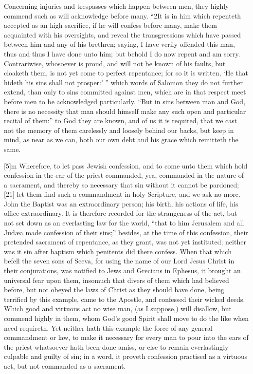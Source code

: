 Concerning injuries and trespasses which happen between men, they highly commend such as will acknowledge before many. “2It is in him which repenteth accepted as an high sacrifice, if he will confess before many, make them acquainted with his oversights, and reveal the transgressions which have passed between him and any of his brethren; saying, I have verily offended this man, thus and thus I have done unto him; but behold I do now repent and am sorry. Contrariwise, whosoever is proud, and will not be known of his faults, but cloaketh them, is not yet come to perfect repentance; for so it is written, ‘He that hideth his sins shall not prosper:’ ” which words of Salomon they do not further extend, than only to sins committed against men, which are in that respect meet before men to be acknowledged particularly. “But in sins between man and God, there is no necessity that man should himself make any such open and particular recital of them:” to God they are known, and of us it is required, that we cast not the memory of them carelessly and loosely behind our backs, but keep in mind, as near as we can, both our own debt and his grace which remitteth the same.

[5]m Wherefore, to let pass Jewish confession, and to come unto them which hold confession in the ear of the priest commanded, yea, commanded in the nature of a sacrament, and thereby so necessary that sin without it cannot be pardoned; [21] let them find such a commandment in holy Scripture, and we ask no more. John the Baptist was an extraordinary person; his birth, his actions of life, his office extraordinary. It is therefore recorded for the strangeness of the act, but not set down as an everlasting law for the world, “that to him Jerusalem and all Judæa made confession of their sins;” besides, at the time of this confession, their pretended sacrament of repentance, as they grant, was not yet instituted; neither was it sin after baptism which penitents did there confess. When that which befell the seven sons of Sceva, for using the name of our Lord Jesus Christ in their conjurations, was notified to Jews and Grecians in Ephesus, it brought an universal fear upon them, insomuch that divers of them which had believed before, but not obeyed the laws of Christ as they should have done, being terrified by this example, came to the Apostle, and confessed their wicked deeds. Which good and virtuous act no wise man, (as I suppose,) will disallow, but commend highly in them, whom God’s good Spirit shall move to do the like when need requireth. Yet neither hath this example the force of any general commandment or law, to make it necessary for every man to pour into the ears of the priest whatsoever hath been done amiss, or else to remain everlastingly culpable and guilty of sin; in a word, it proveth confession practised as a virtuous act, but not commanded as a sacrament.

